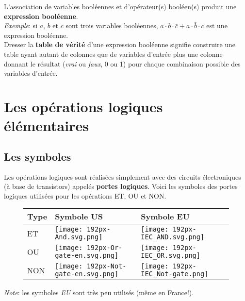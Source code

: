 \documentclass[11pt,french]{article}
\makeatletter
\def\maxwidth{\ifdim\Gin@nat@width>\linewidth\linewidth
    \else\Gin@nat@width\fi}
\let\Oldincludegraphics\includegraphics
\renewcommand{\includegraphics}[1]{\Oldincludegraphics[width=.8\maxwidth]{#1}}
\makeatother
\begin{document}
L'association de variables booléennes et d'opérateur(s) booléen(s)
produit une \textbf{expression booléenne}.\\
\emph{Exemple}: si \(a\), \(b\) et \(c\) sont trois variables
booléennes, \(a\cdot b\cdot \bar{c}+a\cdot \bar{b}\cdot c\) est une
expression booléenne.\\

Dresser la \textbf{table de vérité} d'une expression booléenne signifie
construire une table ayant autant de colonnes que de variables d'entrée
plus une colonne donnant le résultat (\emph{vrai} ou \emph{faux}, 0 ou
1) pour chaque combinaison possible des variables d'entrée.

    \hypertarget{les-opuxe9rations-logiques-uxe9luxe9mentaires}{%
\section{Les opérations logiques
élémentaires}\label{les-opuxe9rations-logiques-uxe9luxe9mentaires}}

\hypertarget{les-symboles}{%
\subsection{Les symboles}\label{les-symboles}}

Les opérations logiques sont réalisées simplement avec des circuits
électroniques (à base de transistors) appelés \textbf{portes logiques}.
Voici les symboles des portes logiques utilisées pour les opérations ET,
OU et NON.
\begin{figure}[h]
	\begin{center}
\begin{tabular}{|m{1.5cm}||m{4.5cm}|m{4.5cm}|}
	\hline
	Type & Symbole US & Symbole EU\\
	\hline
	ET& \texttt{[image: 192px-And.svg.png]} &  \texttt{[image: 192px-IEC\_AND.svg.png]}\\
	\hline
	OU & \texttt{[image: 192px-Or-gate-en.svg.png]} &  \texttt{[image: 192px-IEC\_OR.svg.png]}\\
	\hline
	NON &  \texttt{[image: 192px-Not-gate-en.svg.png]} &  \texttt{[image: 192px-IEC\_Not-gate.png]}\\
	\hline
\end{tabular}
\end{center}
\end{figure}

\emph{Note}: les symboles \emph{EU} sont très peu utilisés (même en France!). 
\end{document}
